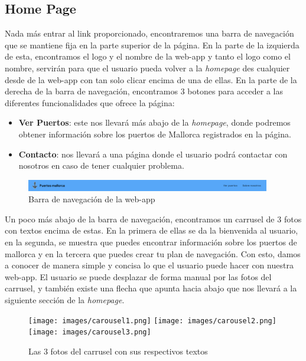 \documentclass{article}
\begin{document}
\subsection{Home Page}
Nada más entrar al link proporcionado, encontraremos una barra de navegación que se mantiene fija en la parte superior de la página. En la parte de la izquierda de esta, encontramos el logo y el nombre de la web-app y tanto el logo como el nombre, servirán para que el usuario pueda volver a la \textit{homepage} des cualquier desde de la web-app con tan solo clicar encima de una de ellas. En la parte de la derecha de la barra de navegación, encontramos 3 botones para acceder a las diferentes funcionalidades que ofrece la página:
\begin{itemize}
    \item \textbf{Ver Puertos}: este nos llevará más abajo de la \textit{homepage}, donde podremos obtener información sobre los puertos de Mallorca registrados en la página.
    \item \textbf{Contacto}: nos llevará a una página donde el usuario podrá contactar con nosotros en caso de tener cualquier problema.
\end{itemize}
\begin{figure}[ht]
    \centering
    \includegraphics[width=0.95\textwidth]{images/nvbar.png}
    \caption{Barra de navegación de la web-app}
\end{figure}
Un poco más abajo de la barra de navegación, encontramos un carrusel de 3 fotos con textos encima de estas. En la primera de ellas se da la bienvenida al usuario, en la segunda, se muestra que puedes encontrar información sobre los puertos de mallorca y en la tercera que puedes crear tu plan de navegación. Con esto, damos a conocer de manera simple y concisa lo que el usuario puede hacer con nuestra web-app. El usuario se puede desplazar de forma manual por las fotos del carrusel, y también existe una flecha que apunta hacia abajo que nos llevará a la siguiente sección de la \textit{homepage}.
\newpage
\begin{figure}[ht]
    \centering
    \texttt{[image: images/carousel1.png]}
    \texttt{[image: images/carousel2.png]}
    \texttt{[image: images/carousel3.png]}
    \caption{Las 3 fotos del carrusel con sus respectivos textos}
\end{figure}
\end{document}
